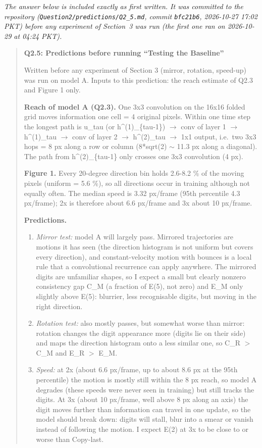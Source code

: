  \emph{The answer below is included exactly as first written. It was committed to the repository
(\texttt{Question2/predictions/Q2\_5.md}, commit \texttt{bfc21b6}, 2026-10-27 17:02 PKT) before any
experiment of Section~3 was run (the first one ran on 2026-10-29 at 04:24 PKT).}

\begin{quote}\small
\textbf{Q2.5: Predictions before running ``Testing the Baseline''}

Written before any experiment of Section 3 (mirror, rotation, speed-up) was run on model A.
Inputs to this prediction: the reach estimate of Q2.3 and Figure 1 only.

\textbf{Reach of model A (Q2.3).} One 3x3 convolution on the 16x16 folded grid moves information one
cell = 4 original pixels. Within one time step the longest path is u\_tau (or h\^{}(1)\_\{tau-1\}) $\to$
conv of layer 1 $\to$ h\^{}(1)\_tau $\to$ conv of layer 2 $\to$ h\^{}(2)\_tau $\to$ 1x1 output, i.e.\ two 3x3 hops = 8 px
along a row or column (8*sqrt(2) $\sim$ 11.3 px along a diagonal). The path from h\^{}(2)\_\{tau-1\} only
crosses one 3x3 convolution (4 px).

\textbf{Figure 1.} Every 20-degree direction bin holds 2.6-8.2 \% of the moving pixels (uniform = 5.6 \%),
so all directions occur in training although not equally often. The median speed is 3.32 px/frame
(95th percentile 4.3 px/frame); 2x is therefore about 6.6 px/frame and 3x about 10 px/frame.

\textbf{Predictions.}
\begin{enumerate}[nosep]
\item \emph{Mirror test:} model A will largely pass. Mirrored trajectories are motions it has seen (the
   direction histogram is not uniform but covers every direction), and constant-velocity motion
   with bounces is a local rule that a convolutional recurrence can apply anywhere. The mirrored
   digits are unfamiliar shapes, so I expect a small but clearly nonzero consistency gap C\_M (a
   fraction of E(5), not zero) and E\_M only slightly above E(5): blurrier, less recognisable
   digits, but moving in the right direction.
\item \emph{Rotation test:} also mostly passes, but somewhat worse than mirror: rotation changes the
   digit appearance more (digits lie on their side) and maps the direction histogram onto a
   less similar one, so C\_R $>$ C\_M and E\_R $>$ E\_M.
\item \emph{Speed:} at 2x (about 6.6 px/frame, up to about 8.6 px at the 95th percentile) the motion is
   mostly still within the 8 px reach, so model A degrades (these speeds were never seen in
   training) but still tracks the digits. At 3x (about 10 px/frame, well above 8 px along an
   axis) the digit moves further than information can travel in one update, so the model should
   break down: digits will stall, blur into a smear or vanish instead of following the motion.
   I expect E(2) at 3x to be close to or worse than Copy-last.
\end{enumerate}
\end{quote}

